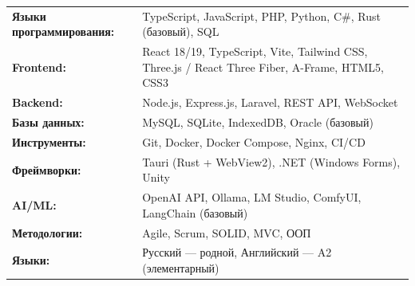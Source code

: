 \documentclass[10pt,a4paper]{article}
\begin{document}
\begin{tabular}{p{3.5cm} p{12cm}}
    \textbf{Языки программирования:} & TypeScript, JavaScript, PHP, Python, C\#, Rust (базовый), SQL \\
    \textbf{Frontend:} & React 18/19, TypeScript, Vite, Tailwind CSS, Three.js / React Three Fiber, A-Frame, HTML5, CSS3 \\
    \textbf{Backend:} & Node.js, Express.js, Laravel, REST API, WebSocket \\
    \textbf{Базы данных:} & MySQL, SQLite, IndexedDB, Oracle (базовый) \\
    \textbf{Инструменты:} & Git, Docker, Docker Compose, Nginx, CI/CD \\
    \textbf{Фреймворки:} & Tauri (Rust + WebView2), .NET (Windows Forms), Unity \\
    \textbf{AI/ML:} & OpenAI API, Ollama, LM Studio, ComfyUI, LangChain (базовый) \\
    \textbf{Методологии:} & Agile, Scrum, SOLID, MVC, ООП \\
    \textbf{Языки:} & Русский --- родной, Английский --- A2 (элементарный)
\end{tabular}

\end{document}
